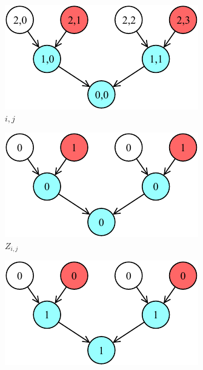 \documentclass[letterpaper,10pt]{article}
\begin{document}
\begin{figure}[hbtp]
    \centering
    \begin{subfigure}[b]{0.30\textwidth}
        \includegraphics[width=\textwidth]{i.pdf}
        \caption{$i,j$}
        \label{subfig:i}
    \end{subfigure}
    \hspace{0.01\textwidth}
    \begin{subfigure}[b]{0.30\textwidth}
        \includegraphics[width=\textwidth]{Z.pdf}
        \caption{$Z_{i,j}$}
        \label{subfig:zi}
    \end{subfigure}
    \hspace{0.01\textwidth}
    \begin{subfigure}[b]{0.30\textwidth}
        \includegraphics[width=\textwidth]{N.pdf}

\end{subfigure}
\end{figure}
\end{document}
